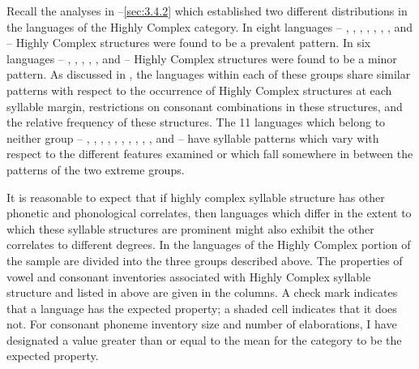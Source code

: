   Recall the analyses in --\ref{sec:3.4.2} which established two different distributions in the languages of the Highly Complex category. In eight languages -- , , , , , , , and  -- Highly Complex structures were found to be a prevalent pattern. In six languages -- , , , , , and  -- Highly Complex structures were found to be a minor pattern. As discussed in , the languages within each of these groups share similar patterns with respect to the occurrence of Highly Complex structures at each syllable margin, restrictions on consonant combinations in these structures, and the relative frequency of these structures. The 11 languages which belong to neither group -- , , , , , , , , , , and  -- have syllable patterns which vary with respect to the different features examined or which fall somewhere in between the patterns of the two extreme groups.

  It is reasonable to expect that if highly complex syllable structure has other phonetic and phonological correlates, then languages which differ in the extent to which these syllable structures are prominent might also exhibit the other correlates to different degrees. In  the languages of the Highly Complex portion of the sample are divided into the three groups described above. The properties of vowel and consonant inventories associated with Highly Complex syllable structure and listed in  above are given in the columns. A check mark indicates that a language has the expected property; a shaded cell indicates that it does not. For consonant phoneme inventory size and number of elaborations, I have designated a value greater than or equal to the mean for the category to be the expected property.

